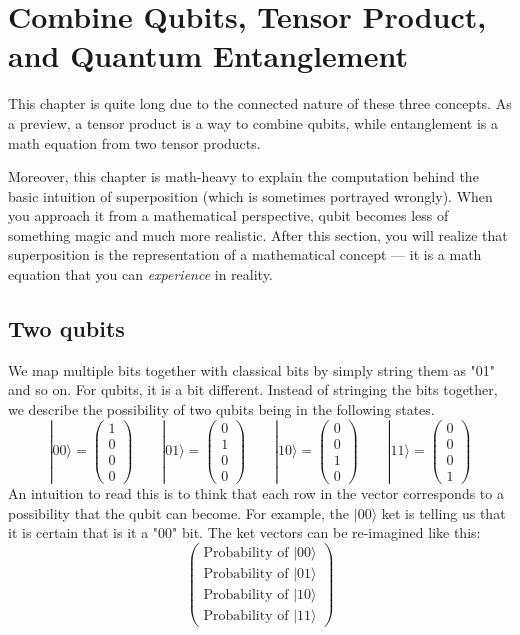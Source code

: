 \chapter{Combine Qubits, Tensor Product, and Quantum Entanglement}
This chapter is quite long due to the connected nature of these three concepts. As a preview, a tensor product is a way to combine qubits, while entanglement is a math equation from two tensor products.

Moreover, this chapter is math-heavy to explain the computation behind the basic intuition of superposition (which is sometimes portrayed wrongly). When you approach it from a mathematical perspective, qubit becomes less of something magic and much more realistic. After this section, you will realize that superposition is the representation of a mathematical concept — it is a math equation that you can \textit{experience} in reality.

\section{Two qubits}
We map multiple bits together with classical bits by simply string them as "01" and so on. For qubits, it is a bit different. Instead of stringing the bits together, we describe the possibility of two qubits being in the following states.
\begin{equation}
    \label{eq:p1}
    |00\rangle = \begin{pmatrix}1 \\ 0 \\ 0 \\ 0\end{pmatrix}
    \qquad
    |01\rangle = \begin{pmatrix}0 \\ 1 \\ 0 \\ 0\end{pmatrix}
    \qquad
    |10\rangle = \begin{pmatrix}0 \\ 0 \\ 1 \\ 0\end{pmatrix}
    \qquad
    |11\rangle = \begin{pmatrix}0 \\ 0 \\ 0 \\ 1\end{pmatrix}
\end{equation}
An intuition to read this is to think that each row in the vector corresponds to a possibility that the qubit can become. For example, the $|00\rangle$ ket is telling us that it is certain that is it a "00" bit. The ket vectors can be re-imagined like this:
\[
    \begin{pmatrix}
        \text{Probability of }|00\rangle \\ 
        \text{Probability of }|01\rangle \\ 
        \text{Probability of }|10\rangle \\ 
        \text{Probability of }|11\rangle
    \end{pmatrix}
\]


